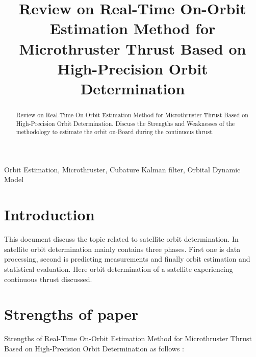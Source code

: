 \documentclass[conference]{IEEEtran}
\begin{document}
\title{Review on Real-Time On-Orbit Estimation Method for Microthruster Thrust
	Based on High-Precision Orbit Determination\\
}

\author{
}

\maketitle

\begin{abstract}
Review on Real-Time On-Orbit Estimation Method for Microthruster Thrust Based on High-Precision Orbit Determination. Discuss the Strengths and Weaknesses of the methodology to estimate the orbit on-Board during the continuous thrust.  
\end{abstract}

\begin{IEEEkeywords}
Orbit Estimation, Microthruster, Cubature Kalman ﬁlter, Orbital Dynamic Model 
\end{IEEEkeywords}

\section{Introduction}
This document discuss the topic related to satellite orbit determination. In satellite orbit determination mainly contains three phases. First one is data processing, second is predicting measurements and finally orbit estimation and statistical evaluation. Here orbit determination of a satellite experiencing continuous thrust discussed.    

\section{Strengths of paper \cite{b1}}

Strengths of Real-Time On-Orbit Estimation Method for Microthruster Thrust Based on High-Precision Orbit Determination as follows :
\end{document}

